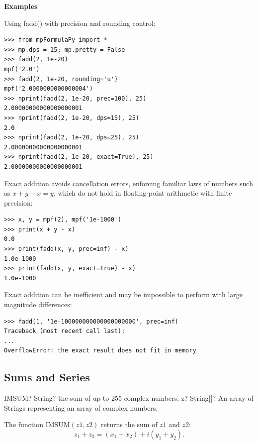 \vpara
\textbf{Examples}

Using fadd() with precision and rounding control:

\begin{lstlisting}
>>> from mpFormulaPy import *
>>> mp.dps = 15; mp.pretty = False
>>> fadd(2, 1e-20)
mpf('2.0')
>>> fadd(2, 1e-20, rounding='u')
mpf('2.0000000000000004')
>>> nprint(fadd(2, 1e-20, prec=100), 25)
2.00000000000000000001
>>> nprint(fadd(2, 1e-20, dps=15), 25)
2.0
>>> nprint(fadd(2, 1e-20, dps=25), 25)
2.00000000000000000001
>>> nprint(fadd(2, 1e-20, exact=True), 25)
2.00000000000000000001
\end{lstlisting}


Exact addition avoids cancellation errors, enforcing familiar laws of numbers such as $x+y-x=y$, which do not hold in floating-point arithmetic with finite precision:

\begin{lstlisting}
>>> x, y = mpf(2), mpf('1e-1000')
>>> print(x + y - x)
0.0
>>> print(fadd(x, y, prec=inf) - x)
1.0e-1000
>>> print(fadd(x, y, exact=True) - x)
1.0e-1000
\end{lstlisting}


Exact addition can be inefficient and may be impossible to perform with large magnitude differences:

\begin{lstlisting}
>>> fadd(1, '1e-100000000000000000000', prec=inf)
Traceback (most recent call last):
...
OverflowError: the exact result does not fit in memory
\end{lstlisting}




\subsection{Sums and Series} 


\vspace{0.6cm}
\begin{mpFunctionsExtract}
	\mpWorksheetFunctionOneNotImplemented
	{IMSUM? String? the sum of up to 255 complex numbers.}
	{z? String[]? An array of Strings representing an array of complex numbers.}
\end{mpFunctionsExtract}

\vspace{0.3cm}
The function \textsf{IMSUM$(z1, z2)$} returns the sum of $z1$ and $z2$: 
\begin{equation}
	z_1 + z_2 =(x_1 + x_2) + i(y_1 + y_2).
\end{equation}



